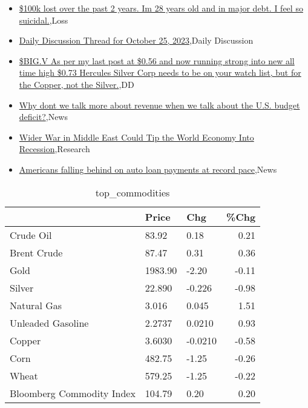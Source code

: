 \documentclass{article}%
\begin{document}
%
\begin{itemize}%
\item%
\href{https://reddit.com/r/wallstreetbets/comments/17g2bx8/100k\_lost\_over\_the\_past\_2\_years\_im\_28\_years\_old/}{\$100k lost over the past 2 years. Im 28 years old and in major debt. I feel so suicidal.},Loss%
\item%
\href{https://reddit.com/r/wallstreetbets/comments/17g19it/daily\_discussion\_thread\_for\_october\_25\_2023/}{Daily Discussion Thread for October 25, 2023},Daily Discussion%
\item%
\href{https://reddit.com/r/Baystreetbets/comments/17fidqo/bigv\_as\_per\_my\_last\_post\_at\_056\_and\_now\_running/}{\$BIG.V As per my last post at \$0.56 and now running strong into new all time high \$0.73 Hercules Silver Corp needs to be on your watch list, but for the Copper, not the Silver.},DD%
\item%
\href{https://reddit.com/r/Economics/comments/17fx1nk/why\_dont\_we\_talk\_more\_about\_revenue\_when\_we\_talk/}{Why dont we talk more about revenue when we talk about the U.S. budget deficit?},News%
\item%
\href{https://reddit.com/r/Economics/comments/17ftwhk/wider\_war\_in\_middle\_east\_could\_tip\_the\_world/}{Wider War in Middle East Could Tip the World Economy Into Recession},Research%
\item%
\href{https://reddit.com/r/Economics/comments/17fm65p/americans\_falling\_behind\_on\_auto\_loan\_payments\_at/}{Americans falling behind on auto loan payments at record pace},News%
\end{itemize}%


\begin{table}[htbp]%
\caption{top\_commodities}%
\centering%
\begin{adjustbox}{width=1\textwidth}%
\begin{tabular}{lllr}
\toprule
                          &   Price &     Chg &  \%Chg \\
\midrule
               Crude Oil  &   83.92 &    0.18 &  0.21 \\
             Brent Crude  &   87.47 &    0.31 &  0.36 \\
                    Gold  & 1983.90 &   -2.20 & -0.11 \\
                  Silver  &  22.890 &  -0.226 & -0.98 \\
             Natural Gas  &   3.016 &   0.045 &  1.51 \\
       Unleaded Gasoline  &  2.2737 &  0.0210 &  0.93 \\
                  Copper  &  3.6030 & -0.0210 & -0.58 \\
                    Corn  &  482.75 &   -1.25 & -0.26 \\
                   Wheat  &  579.25 &   -1.25 & -0.22 \\
Bloomberg Commodity Index &  104.79 &    0.20 &  0.20 \\
\bottomrule
\end{tabular}
%
\end{adjustbox}%
\end{table}
\end{document}
